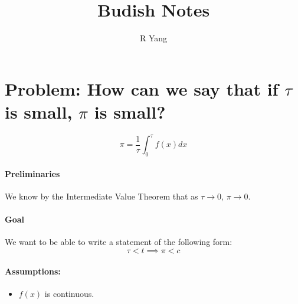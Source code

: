 \documentclass[11pt]{article}
\title{\textbf{Budish Notes}}
\author{R Yang}
\date{}
\begin{document}
\maketitle

\section*{Problem: How can we say that if $\tau$ is small, $\pi$ is small?}

\[ \pi = \frac{1}{\tau}\int_{0}^{\tau}f(x)dx \]

\paragraph{Preliminaries} We know by the Intermediate Value Theorem that as $\tau \rightarrow 0$, $\pi \rightarrow 0$.
\paragraph{Goal} We want to be able to write a statement of the following form:
\[ \tau < t \implies \pi < c \]
\paragraph{Assumptions:}
\begin{itemize}
	\item $f(x)$ is continuous.
\end{itemize}
\end{document}
